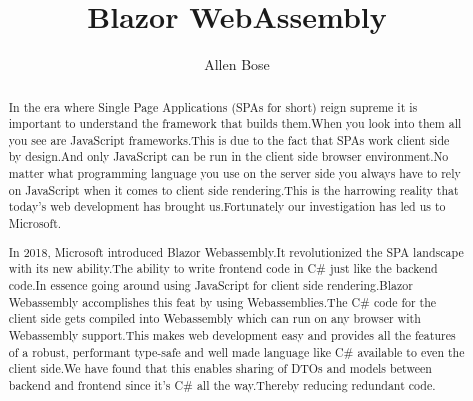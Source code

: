 \documentclass[12pt,a4paper,oneside]{report}
\begin{document}
\title{Blazor WebAssembly}
\author{Allen Bose}
\maketitle

\begin{abstract}
    In the era where Single Page Applications (SPAs for short) reign supreme it is important to understand the framework that builds them.When you look into them all you see are JavaScript frameworks.This is due to the fact that SPAs work client side by design.And only JavaScript can be run in the client side browser environment.No matter what programming language you use on the server side you always have to rely on JavaScript when it comes to client side rendering.This is the harrowing reality that today's web development has brought us.Fortunately our investigation has led us to Microsoft.

    In 2018, Microsoft introduced Blazor Webassembly.It revolutionized the SPA landscape with its new ability.The ability to write frontend code in C\# just like the backend code.In essence going around using JavaScript for client side rendering.Blazor Webassembly accomplishes this feat by using Webassemblies.The C\# code for the client side gets compiled into Webassembly which can run on any browser with Webassembly support.This makes web development easy and provides all the features of a robust, performant type-safe and well made language like C\# available to even the client side.We have found that this enables sharing of DTOs and models between backend and frontend since it's C\# all the way.Thereby reducing redundant code.
\end{abstract}
\end{document}
